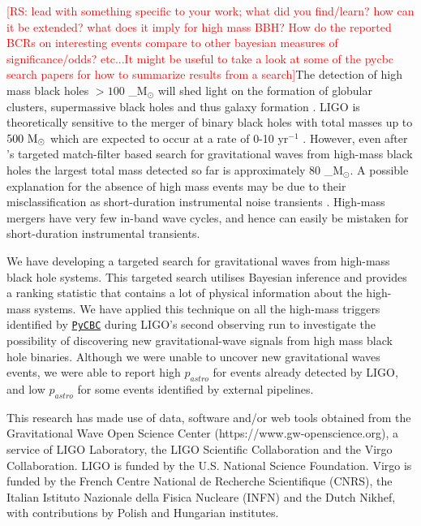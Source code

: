 \documentclass[%
 amsmath,amssymb,
 aps,
twocolumn
]{revtex4}
\newcommand{\pycbc}{{\sc \href{https://pycbc.org/}{\texttt{PyCBC}}}\xspace}
\newcommand{\mathcmd}[1]{{\sc \relax\ifmmode#1\else $#1$\fi}\xspace}
\newcommand{\msun}{\mathcmd{\text{M}_\odot}}
\newcommand{\rs}[1]{\textcolor{red}{[RS: #1]}}
\begin{document}
\rs{lead with something specific to your work; what did you find/learn? how can it be extended? what does it imply for high mass BBH? How do the reported BCRs on interesting events compare to other bayesian measures of significance/odds? etc...It might be useful to take a look at some of the pycbc search papers for how to summarize results from a search}The detection of high mass black holes $>100$ \msun will shed light on the formation of globular clusters, supermassive black holes and thus galaxy formation \citep{lodato2006supermassive, 2018IMBHreview}. LIGO is theoretically sensitive to the merger of binary black holes with total masses up to $500\ \msun$ which are expected to occur at a rate of 0-10 yr\(^{-1}\) \cite{mandel2008rates, fregeau2006imbhbRatePrediction}. However, even after \citet{ligo_imbh_search}'s targeted match-filter based search for gravitational waves from high-mass black holes the largest total mass detected so far is approximately 80 \msun \citep{abbott2019gwtc}. A possible explanation for the absence of high mass events may be due to their misclassification as short-duration instrumental noise transients \citep{blipGlitches}. High-mass mergers have very few in-band wave cycles, and hence can easily be mistaken for short-duration instrumental transients. 

We have developing a targeted search for gravitational waves from high-mass black hole systems. This targeted search utilises Bayesian inference and provides a ranking statistic that contains a lot of physical information about the high-mass systems. We have applied this technique on all the high-mass triggers identified by \pycbc during LIGO's second observing run to investigate the possibility of discovering new gravitational-wave signals from high mass black hole binaries. Although we were unable to uncover new gravitational waves events, we were able to report high $p_{astro}$ for events already detected by LIGO, and low $p_{astro}$ for some events identified by external pipelines. 

\begin{acknowledgments}

This research has made use of data, software and/or web tools obtained from the Gravitational Wave Open Science Center (https://www.gw-openscience.org), a service of LIGO Laboratory, the LIGO Scientific Collaboration and the Virgo Collaboration. LIGO is funded by the U.S. National Science Foundation. Virgo is funded by the French Centre National de Recherche Scientifique (CNRS), the Italian Istituto Nazionale della Fisica Nucleare (INFN) and the Dutch Nikhef, with contributions by Polish and Hungarian institutes.

\end{acknowledgments}





\end{document}
